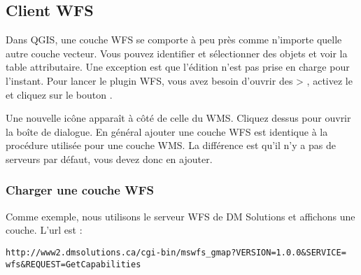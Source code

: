 \subsection{Client WFS}

Dans QGIS, une couche WFS se comporte \`a peu pr\`es comme n'importe quelle autre
couche vecteur. Vous pouvez identifier et s\'electionner des objets et
voir la table attributaire. Une exception est que l'\'edition n'est
pas prise en charge pour l'instant. Pour lancer le plugin WFS, vous avez besoin
d'ouvrir des  >
, activez
le  et cliquez sur le bouton .

Une nouvelle ic\^one 
appara\^it \`a c\^ot\'e de celle du WMS. Cliquez dessus pour ouvrir la bo\^ite de
dialogue. En g\'en\'eral ajouter une couche WFS est identique \`a la proc\'edure
utilis\'ee pour une couche WMS. La diff\'erence est qu'il n'y a pas de serveurs par
d\'efaut, vous devez donc en ajouter.

\subsubsection{Charger une couche WFS}

Comme exemple, nous utilisons le serveur WFS de DM Solutions et affichons une
couche. L'url est :
\begin{verbatim}
http://www2.dmsolutions.ca/cgi-bin/mswfs_gmap?VERSION=1.0.0&SERVICE=
wfs&REQUEST=GetCapabilities
\end{verbatim}

